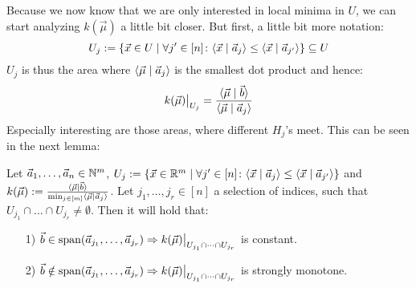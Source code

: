 Because we now know that we are only interested in local minima in $U$, we can start analyzing $k(\vec \mu)$ a little bit closer. But first, a little bit more notation:
$$U_j := \{\vec x \in U \mid \forall j' \in [n]\colon \langle \vec x \mid \vec a_j \rangle \leq \langle \vec x \mid \vec a_{j'} \rangle\} \subseteq U$$
$U_j$ is thus the area where $\langle \vec\mu \mid \vec a_j \rangle$ is the smallest dot product and hence:
$$\restrict{k(\vec\mu)}{U_j} = \frac{\sprod{\vec\mu}{\vec b}}{\sprod{\vec\mu}{\vec a_j}}$$
Especially interesting are those areas, where different $H_j$'s meet. This can be seen in the next lemma:

\begin{lemma}
    \label{lemma:k_behavior}
    Let $\vec a_1, \dots, \vec a_n \in \mathbb{N}^m$, $U_j := \{\vec x \in \mathbb{R}^m \mid \forall j' \in [n]\colon \langle \vec x \mid \vec a_j \rangle \leq \langle \vec x \mid \vec a_{j'} \rangle\}$ and $k(\vec \mu) := \frac{\langle \vec{\mu} \mid \vec b \rangle}{\min_{j \in [m]} \langle \vec \mu \mid \vec a_j \rangle}$. Let $j_1, \dots, j_r \in [n]$ a selection of indices, such that $U_{j_1} \cap \dots \cap U_{j_r} \neq \emptyset$.  Then it will hold that:
    \begin{itemize}
        \item[1)] $\vec b \in \Span(\vec a_{j_1}, \dots, \vec a_{j_r}) \Rightarrow \restrict{k(\vec \mu)}{U_{j_1} \cap \dots \cap U_{j_r}}$ is constant.
        \item[2)] $\vec b \notin \Span(\vec a_{j_1}, \dots, \vec a_{j_r}) \Rightarrow \restrict{k(\vec \mu)}{U_{j_1} \cap \dots \cap U_{j_r}}$ is strongly monotone.
    \end{itemize}
\end{lemma}
